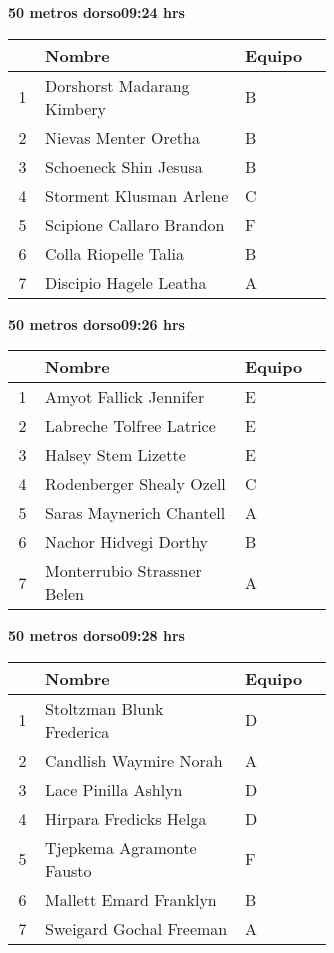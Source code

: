 \begin{minipage}{0.95\linewidth}
\begin{center}
\textbf{
50 metros dorso\hspace{1cm}09:24 hrs}
\end{center}
\begin{tabular}{cp{0.63\linewidth}l}
\hline
& \textbf{Nombre} & \textbf{Equipo} \\ \hline
1 & Dorshorst Madarang Kimbery & B \\ 
2 & Nievas Menter Oretha & B \\ 
3 & Schoeneck Shin Jesusa & B \\ 
4 & Storment Klusman Arlene & C \\ 
5 & Scipione Callaro Brandon & F \\ 
6 & Colla Riopelle Talia & B \\ 
7 & Discipio Hagele Leatha & A \\ 
\end{tabular}
\end{minipage}
\begin{minipage}{0.95\linewidth}
\begin{center}
\textbf{
50 metros dorso\hspace{1cm}09:26 hrs}
\end{center}
\begin{tabular}{cp{0.63\linewidth}l}
\hline
& \textbf{Nombre} & \textbf{Equipo} \\ \hline
1 & Amyot Fallick Jennifer & E \\ 
2 & Labreche Tolfree Latrice & E \\ 
3 & Halsey Stem Lizette & E \\ 
4 & Rodenberger Shealy Ozell & C \\ 
5 & Saras Maynerich Chantell & A \\ 
6 & Nachor Hidvegi Dorthy & B \\ 
7 & Monterrubio Strassner Belen & A \\ 
\end{tabular}
\end{minipage}
\begin{minipage}{0.95\linewidth}
\begin{center}
\textbf{
50 metros dorso\hspace{1cm}09:28 hrs}
\end{center}
\begin{tabular}{cp{0.63\linewidth}l}
\hline
& \textbf{Nombre} & \textbf{Equipo} \\ \hline
1 & Stoltzman Blunk Frederica & D \\ 
2 & Candlish Waymire Norah & A \\ 
3 & Lace Pinilla Ashlyn & D \\ 
4 & Hirpara Fredicks Helga & D \\ 
5 & Tjepkema Agramonte Fausto & F \\ 
6 & Mallett Emard Franklyn & B \\ 
7 & Sweigard Gochal Freeman & A \\ 
\end{tabular}
\end{minipage}
